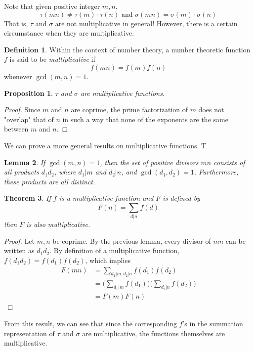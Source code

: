 \documentclass{article}
\newtheorem{theorem}{Theorem}[section]
\newtheorem{proposition}[theorem]{Proposition}
\newtheorem{lemma}[theorem]{Lemma}
\theoremstyle{remark}
\theoremstyle{definition}
\newtheorem{definition}{Definition}[section]
\begin{document}
Note that given positive integer $m, n$, 
\[\tau(m n) \neq \tau(m) \cdot \tau(n) \text{ and } \sigma(m n) = \sigma(m) \cdot \sigma(n)\]
That is, $\tau$ and $\sigma$ are not multiplicative in general! However, there is a certain circumstance when they are multiplicative. 

\begin{definition}
Within the context of number theory, a number theoretic function $f$ is said to be \textit{multiplicative} if 
\[f(m n) = f(m) f(n)\]
whenever $\gcd(m, n) = 1$. 
\end{definition}

\begin{proposition}
$\tau$ and $\sigma$ are multiplicative functions. 
\end{proposition}
\begin{proof}
Since $m$ and $n$ are coprime, the prime factorization of $m$ does not "overlap" that of $n$ in such a way that none of the exponents are the same between $m$ and $n$. 
\end{proof}

We can prove a more general results on multiplicative functions. T

\begin{lemma}
If $\gcd(m, n) = 1$, then the set of positive divisors $mn$ consists of all products $d_1 d_2$, where $d_1 | m$ and $d_2 | n$, and $\gcd(d_1, d_2) = 1$. Furthermore, these products are all distinct. 
\end{lemma}

\begin{theorem}
If $f$ is a multiplicative function and $F$ is defined by 
\[F(n) = \sum_{d|n} f(d)\]
then $F$ is also multiplicative. 
\end{theorem}
\begin{proof}
Let $m, n$ be coprime. By the previous lemma, every divisor of $mn$ can be written as $d_1 d_2$. By definition of a multiplicative function, $f(d_1d_2) = f(d_1) f(d_2)$, which implies
\begin{align*}
    F(mn) & = \sum_{d_1|m, d_2|n} f(d_1) f(d_2) \\
    & = \bigg( \sum_{d_1|m} f(d_1) \bigg) \bigg( \sum_{d_2|n} f(d_2) \bigg) \\
    & = F(m) F(n)
\end{align*}
\end{proof}

From this result, we can see that since the corresponding $f$'s in the summation representation of $\tau$ and $\sigma$ are multiplicative, the functions themselves are multiplicative. 
\end{document}
